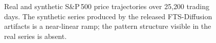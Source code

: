 
\begin{figure}[t]
  \centering
  \caption{Real and synthetic S\&P\,500 price trajectories over 25{,}200
  trading days. The synthetic series produced by the released FTS-Diffusion
  artifacts is a near-linear ramp; the pattern structure visible in the real
  series is absent. }
  \label{fig:teaser}
\end{figure}

